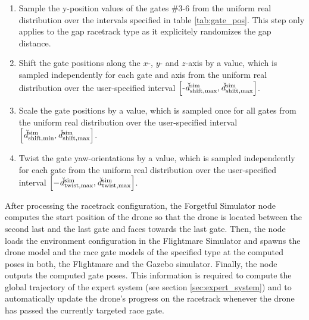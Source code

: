\begin{enumerate}
    \item Sample the y-position values 
    of the gates \#3-6 from the uniform real distribution
    over the intervals specified in table \ref{tab:gate_pos}.
    This step only applies to the gap racetrack type
    as it explicitely randomizes the gap distance.
    \item Shift the gate positions along the $x$-, $y$- and $z$-axis
    by a value, which is sampled
    independently for each gate and axis
    from the uniform real distribution
    over the user-specified interval 
    $\left[
        \text{-}\dist[\user]{\text{sim}}{\text{shift},\mxm}{}{},
        \dist[\user]{\text{sim}}{\text{shift},\mxm}{}{}\right]$.
    \item Scale the gate positions by a value,
    which is sampled once for all gates from the uniform real distribution
    over the user-specified interval
    $\left[
        \dist[\user]{\text{sim}}{\text{shift},\mnm}{}{}, 
        \dist[\user]{\text{sim}}{\text{shift},\mxm}{}{}\right]$.
    \item Twist the gate yaw-orientations
    by a value, which is sampled 
    independently for each gate 
    from the uniform real distribution
    over the user-specified interval
    $\left[
        -\dist[\user]{\text{sim}}{\text{twist},\mxm}{}{},
        \dist[\user]{\text{sim}}{\text{twist},\mxm}{}{}\right]$.
\end{enumerate}
After processing the racetrack configuration,
the Forgetful Simulator node computes
the start position of the drone so that
the drone is located between the second last and the last gate
and faces towards the last gate.
Then, the node loads the 
environment configuration
in the Flightmare Simulator 
and 
spawns the drone model 
and the race gate models of the specified type
at the computed poses
in both, the Flightmare and the Gazebo simulator.
Finally, the node
outputs the computed gate poses.
This information is required 
to compute the global trajectory of the expert system
(see section \ref{sec:expert_system})
and to automatically update the drone's progress on the racetrack
whenever the drone has passed the currently targeted race gate.













